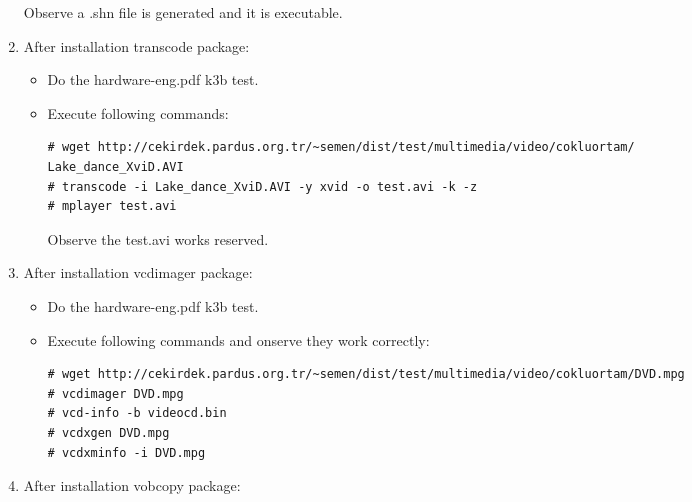 \documentclass[a4paper,10pt]{article}
\begin{document}
\begin{enumerate}
Observe a .shn file is generated and it is executable.
\item After installation transcode package:

\begin{itemize}
 \item Do the hardware-eng.pdf k3b test.
 \item Execute following commands:
\begin{verbatim}
# wget http://cekirdek.pardus.org.tr/~semen/dist/test/multimedia/video/cokluortam/
Lake_dance_XviD.AVI
# transcode -i Lake_dance_XviD.AVI -y xvid -o test.avi -k -z
# mplayer test.avi
\end{verbatim}
 Observe the test.avi works reserved.
\end{itemize}

\item After installation vcdimager package:

\begin{itemize}
 \item Do the hardware-eng.pdf k3b test.
 \item Execute following commands and onserve they work correctly:
\begin{verbatim}
# wget http://cekirdek.pardus.org.tr/~semen/dist/test/multimedia/video/cokluortam/DVD.mpg
# vcdimager DVD.mpg
# vcd-info -b videocd.bin
# vcdxgen DVD.mpg
# vcdxminfo -i DVD.mpg
\end{verbatim}

\end{itemize}
\item After installation vobcopy package:

\end{enumerate}
\end{document}
